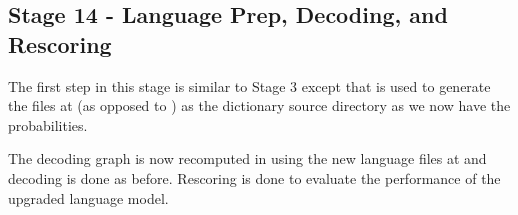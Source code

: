 \subsection{ Stage 14 - Language Prep, Decoding, and Rescoring}
The first step in this stage is similar to Stage 3 except that  is used to generate the files at  (as opposed to )  as the dictionary source directory as we now have the probabilities.

The decoding graph is now recomputed in  using the new language files at  and decoding is done as before. Rescoring is done to evaluate the performance of the upgraded language model.
